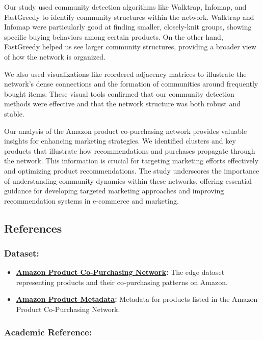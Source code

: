 \documentclass[
]{article}
\begin{document}
Our study used community detection algorithms like Walktrap, Infomap,
and FastGreedy to identify community structures within the network.
Walktrap and Infomap were particularly good at finding smaller,
closely-knit groups, showing specific buying behaviors among certain
products. On the other hand, FastGreedy helped us see larger community
structures, providing a broader view of how the network is organized.

We also used visualizations like reordered adjacency matrices to
illustrate the network's dense connections and the formation of
communities around frequently bought items. These visual tools confirmed
that our community detection methods were effective and that the network
structure was both robust and stable.

Our analysis of the Amazon product co-purchasing network provides
valuable insights for enhancing marketing strategies. We identified
clusters and key products that illustrate how recommendations and
purchases propagate through the network. This information is crucial for
targeting marketing efforts effectively and optimizing product
recommendations. The study underscores the importance of understanding
community dynamics within these networks, offering essential guidance
for developing targeted marketing approaches and improving
recommendation systems in e-commerce and marketing.

\subsection{References}\label{references}

\subsubsection{Dataset:}\label{dataset}

\begin{itemize}
\item
  \href{https://snap.stanford.edu/data/amazon0601.html}{\textbf{Amazon
  Product Co-Purchasing Network}}\textbf{:} The edge dataset
  representing products and their co-purchasing patterns on Amazon.
\item
  \href{https://snap.stanford.edu/data/amazon-meta.html}{\textbf{Amazon
  Product Metadata}}\textbf{:} Metadata for products listed in the
  Amazon Product Co-Purchasing Network.
\end{itemize}

\subsubsection{Academic Reference:}\label{academic-reference}
\end{document}
